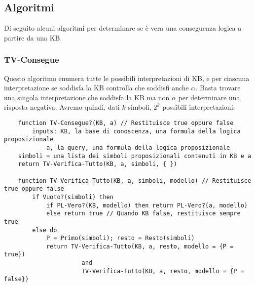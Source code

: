 \newpage
\subsection{Algoritmi}
Di seguito alcuni algoritmi per determinare se è vera una conseguenza logica a partire da una KB.
\subsubsection{TV-Consegue}
Questo algoritmo enumera tutte le possibili interpretazioni di KB, e per ciascuna interpretazione se soddisfa la KB controlla che soddisfi anche $\alpha$. Basta trovare una singola interpretazione che soddisfa la KB ma non $\alpha$ per determinare una risposta negativa. Avremo quindi, dati $k$ simboli, $2^k$ possibili interpretazioni.
\label{alg:tv_consegue}
\begin{lstlisting}
	function TV-Consegue?(KB, a) // Restituisce true oppure false
		inputs: KB, la base di conoscenza, una formula della logica proposizionale
			a, la query, una formula della logica proposizionale
	simboli = una lista dei simboli proposizionali contenuti in KB e a
	return TV-Verifica-Tutto(KB, a, simboli, { })
	
	function TV-Verifica-Tutto(KB, a, simboli, modello) // Restituisce true oppure false
		if Vuoto?(simboli) then
			if PL-Vero?(KB, modello) then return PL-Vero?(a, modello)
			else return true // Quando KB false, restituisce sempre true
		else do
			P = Primo(simboli); resto = Resto(simboli)
			return TV-Verifica-Tutto(KB, a, resto, modello = {P = true})
					  and
					  TV-Verifica-Tutto(KB, a, resto, modello = {P = false})
\end{lstlisting}

